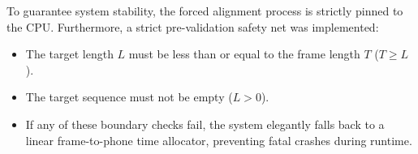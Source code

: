 To guarantee system stability, the forced alignment process is strictly pinned to the CPU. Furthermore, a strict pre-validation safety net was implemented:
\begin{itemize}
    \item The target length $L$ must be less than or equal to the frame length $T$ ($T \ge L$).
    \item The target sequence must not be empty ($L > 0$).
    \item If any of these boundary checks fail, the system elegantly falls back to a linear frame-to-phone time allocator, preventing fatal crashes during runtime.
\end{itemize}
